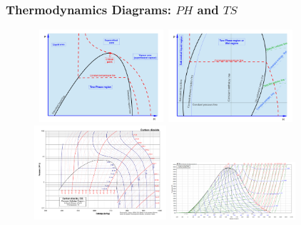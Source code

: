 \documentclass[10pt,compress,handout,ignorenonframetext]{beamer}
\begin{document}

\begin{frame}
 \frametitle{Thermodynamics Diagrams: $PH$ and $TS$}
   \begin{figure}%
     \vbox{
      \hbox{\hspace{.2cm}
      \includegraphics[width=4.6cm,height=4.cm,clip]{./Pics/Overview_Refrig18}
      \hspace{.1cm}
      \includegraphics[width=4.6cm,height=4.cm,clip]{./Pics/Overview_Refrig17}}
      \vspace{-.1cm}
      \hbox{\hspace{.2cm}
      \includegraphics[width=4.9cm,height=4.cm,clip]{./Pics/CO2col}
      \hspace{.1cm}
      \includegraphics[width=4.6cm,height=4.cm,clip]{./Pics/water_TS.png}}}
   \end{figure}
\end{frame}
\end{document}
